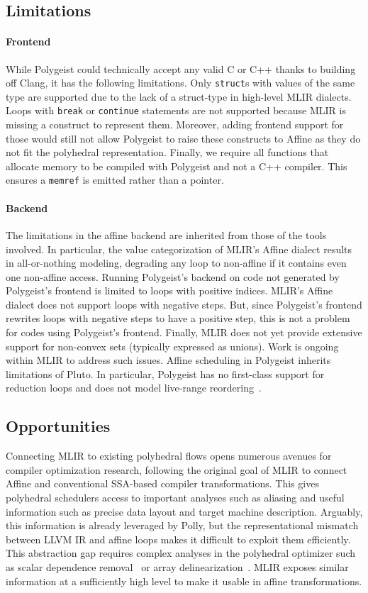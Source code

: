 \documentclass[sigplan]{acmart}
\newcommand{\icode}[1]{{\texttt {#1}}}
\newcommand{\tool}{Polygeist\xspace}
\newcommand{\memref}{\icode{memref}\xspace}
\begin{document}
\subsection{Limitations}
\paragraph{Frontend}
While \tool could technically accept any valid C or C++ thanks to building off Clang, it has the following limitations.
Only \icode{struct}s with values of the same type are supported due to the lack of a struct-type in high-level MLIR dialects. 
Loops with \icode{break} or \icode{continue} statements are not supported because MLIR is missing a construct to represent them. Moreover, adding frontend support for those would still not allow \tool to raise these constructs to Affine as they do not fit the
polyhedral representation. Finally, we require all functions that allocate memory to be compiled with \tool and not a C++ compiler. This ensures a \memref is emitted rather than a pointer.


\paragraph{Backend}
The limitations in the affine backend are inherited from those of the tools involved.
In particular, the value categorization of MLIR's Affine dialect results in all-or-nothing modeling, degrading any loop to non-affine if it contains even one non-affine access. Running \tool's backend on code not generated by \tool's frontend is limited to loops with positive indices. MLIR's Affine dialect does not support loops with negative steps. But, since \tool's frontend rewrites loops with negative steps to have a positive step, this is not a problem for codes using \tool's frontend. Finally, MLIR does not yet provide extensive support for non-convex sets (typically expressed as unions). Work is ongoing within MLIR to address such issues. Affine scheduling in \tool inherits limitations of Pluto. In particular, \tool has no first-class support for reduction loops and does not model live-range reordering~\cite{verdoolaege2016live}.

\subsection{Opportunities}\label{sec:opportunites}
Connecting MLIR to existing polyhedral flows opens numerous avenues for compiler optimization research,
following the original goal of MLIR to connect Affine and conventional SSA-based compiler transformations.
This gives polyhedral schedulers access to important analyses such as aliasing and useful information such as precise data layout and target machine description.
Arguably, this information is already leveraged by Polly, but the representational mismatch between LLVM IR and affine loops makes it difficult to exploit them efficiently. This abstraction gap requires 
complex analyses in the polyhedral optimizer such as scalar dependence removal~\cite{delicm} or array delinearization~\cite{delinearization}.
MLIR exposes similar information at a sufficiently high level to make it usable in affine transformations.
\end{document}
